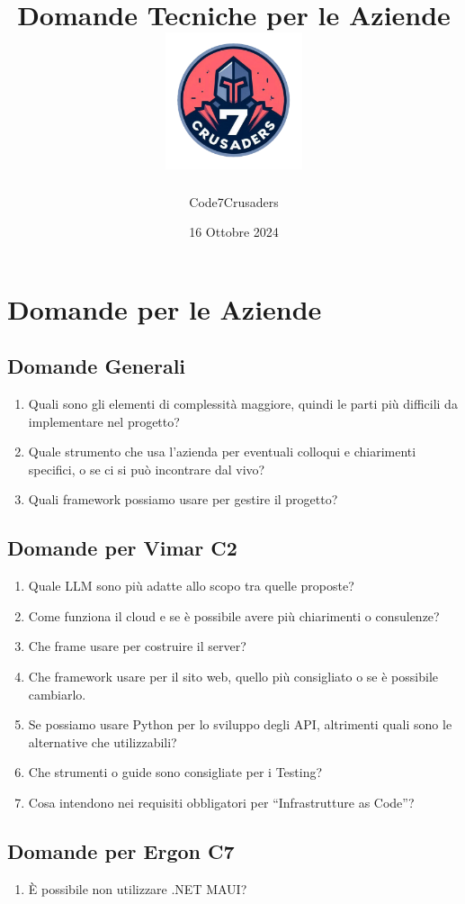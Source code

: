 \documentclass[a4paper,11pt]{article}
\title{
    \textbf{Domande Tecniche per le Aziende}\\
    \vspace{1cm}
    \includegraphics[width=0.3\textwidth]{../../logo/7Crusaders_logo.png} %
}
\author{Code7Crusaders}
\date{16 Ottobre 2024}
\begin{document}
\maketitle

\section{Domande per le Aziende}
\subsection{Domande Generali}
\begin{enumerate}
    \item Quali sono gli elementi di complessità maggiore, quindi le parti più difficili da implementare nel progetto?
    \item Quale strumento che usa l’azienda per eventuali colloqui e chiarimenti specifici, o se ci si può incontrare dal vivo?
    \item Quali framework possiamo usare per gestire il progetto? 
\end{enumerate}

\subsection{Domande per Vimar C2}
\begin{enumerate}
    \item Quale LLM sono più adatte allo scopo tra quelle proposte?
    \item Come funziona il cloud e se è possibile avere più chiarimenti o consulenze?
    \item Che frame usare per costruire il server?
    \item Che framework usare per il sito web, quello più consigliato o se è possibile cambiarlo.
    \item Se possiamo usare Python per lo sviluppo degli API, altrimenti quali sono le alternative che utilizzabili?
    \item Che strumenti o guide sono consigliate per i Testing?
    \item Cosa intendono nei requisiti obbligatori per “Infrastrutture as Code”?
\end{enumerate}

\subsection{Domande per Ergon C7}
\begin{enumerate}
    \item È possibile non utilizzare .NET MAUI?
\end{enumerate}
\end{document}
